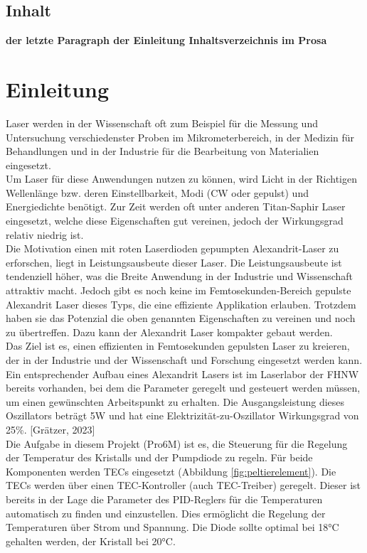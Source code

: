 \subsection{Inhalt}
\textbf{der letzte Paragraph der Einleitung Inhaltsverzeichnis im Prosa}

\section{Einleitung}
Laser werden in der Wissenschaft oft zum Beispiel für die Messung und Untersuchung verschiedenster Proben im Mikrometerbereich, in der Medizin für Behandlungen und in der Industrie für die Bearbeitung von Materialien eingesetzt.\\
Um Laser für diese Anwendungen nutzen zu können, wird Licht in der Richtigen Wellenlänge bzw. deren Einstellbarkeit, Modi (CW oder gepulst) und Energiedichte benötigt. Zur Zeit werden oft unter anderen Titan-Saphir Laser eingesetzt, welche diese Eigenschaften gut vereinen, jedoch der Wirkungsgrad relativ niedrig ist.\\
Die Motivation einen mit roten Laserdioden gepumpten Alexandrit-Laser zu erforschen, liegt in Leistungsausbeute dieser Laser. Die Leistungsausbeute ist tendenziell höher, was die Breite Anwendung in der Industrie und Wissenschaft attraktiv macht. Jedoch gibt es noch keine im Femtosekunden-Bereich gepulste Alexandrit Laser dieses Typs, die eine effiziente Applikation erlauben. Trotzdem haben sie das Potenzial die oben genannten Eigenschaften zu vereinen und noch zu übertreffen. Dazu kann der Alexandrit Laser kompakter gebaut werden.\\

Das Ziel ist es, einen effizienten in Femtosekunden gepulsten Laser zu kreieren, der in der Industrie und der Wissenschaft und Forschung eingesetzt werden kann.\\
Ein entsprechender Aufbau eines Alexandrit Lasers ist im Laserlabor der FHNW bereits vorhanden, bei dem die Parameter geregelt und gesteuert werden müssen, um einen gewünschten Arbeitspunkt zu erhalten. Die Ausgangsleistung dieses Oszillators beträgt 5W und hat eine Elektrizität-zu-Oszillator Wirkungsgrad von 25\%. [Grätzer, 2023]\\  %

Die Aufgabe in diesem Projekt (Pro6M) ist es,  die Steuerung für die Regelung der Temperatur des Kristalls und der Pumpdiode zu regeln. Für beide Komponenten werden TECs eingesetzt (Abbildung \ref{fig:peltierelement}).  Die TECs werden über einen TEC-Kontroller (auch TEC-Treiber) geregelt. Dieser ist bereits in der Lage  die Parameter des PID-Reglers für die Temperaturen automatisch zu finden und einzustellen. Dies ermöglicht die Regelung der Temperaturen über Strom und Spannung. Die Diode sollte optimal bei 18°C gehalten werden, der Kristall bei 20°C.

